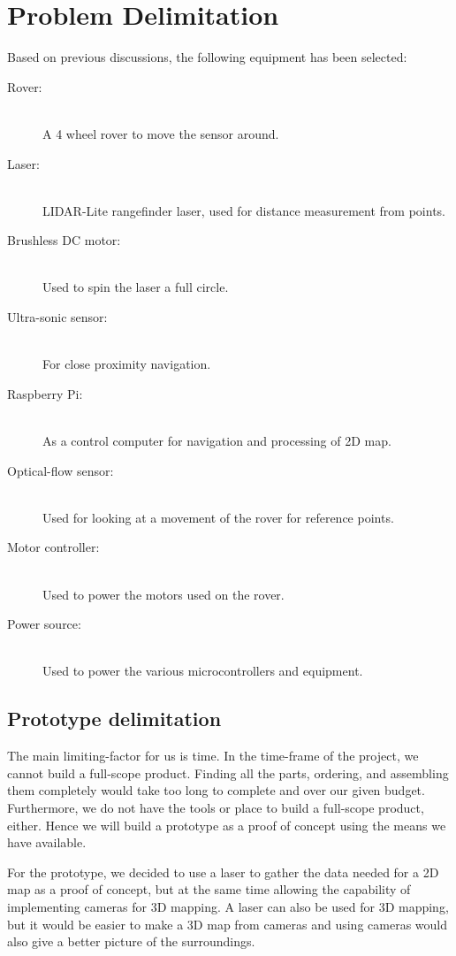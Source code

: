 \section{Problem Delimitation}
Based on previous discussions, the following equipment has been selected:

\begin{description}
  \item[Rover:] \hfill \\
  A 4 wheel rover to move the sensor around.
  \item[Laser:] \hfill \\
  LIDAR-Lite rangefinder laser, used for distance measurement from points.
  \item[Brushless DC motor:] \hfill \\
  Used to spin the laser a full circle.
  \item[Ultra-sonic sensor:] \hfill \\
  For close proximity navigation.
  \item[Raspberry Pi:] \hfill \\
  As a control computer for navigation and processing of 2D map.
  \item[Optical-flow sensor:] \hfill \\
  Used for looking at a movement of the rover for reference points.
  \item[Motor controller:] \hfill \\
  Used to power the motors used on the rover.
  \item[Power source:] \hfill \\
  Used to power the various microcontrollers and equipment.
\end{description}

\subsection{Prototype delimitation}
The main limiting-factor for us is time. In the time-frame of the project, we cannot build a full-scope product. Finding all the parts, ordering, and assembling them completely would take too long to complete and over our given budget. Furthermore, we do not have the tools or place to build a full-scope product, either. Hence we will build a prototype as a proof of concept using the means we have available.

For the prototype, we decided to use a laser to gather the data needed for a 2D map as a proof of concept, but at the same time allowing the capability of implementing cameras for 3D mapping. A laser can also be used for 3D mapping, but it would be easier to make a 3D map from cameras and using cameras would also give a better picture of the surroundings.

